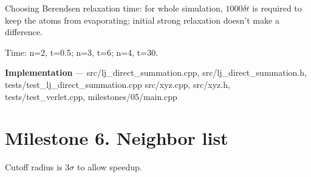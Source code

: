 \documentclass[11pt,a4paper]{article}
\begin{document}
Choosing Berendsen relaxation time: for whole simulation, \(1000\delta t\) is required to keep the atoms from evaporating; initial strong relaxation doesn't make a difference.

Time: n=2, t=0.5; n=3, t=6; n=4, t=30.

{\bf Implementation} --- src/lj\_direct\_summation.cpp, src/lj\_direct\_summation.h, tests/test\_lj\_direct\_summation.cpp src/xyz.cpp, src/xyz.h, tests/test\_verlet.cpp, milestones/05/main.cpp

\section*{Milestone 6. Neighbor list}

Cutoff radius is \( 3 \sigma \) to allow speedup.
\end{document}
